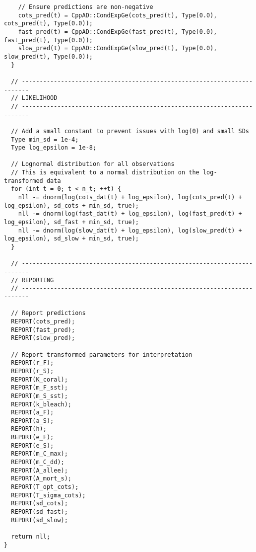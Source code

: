 \begin{lstlisting}
    // Ensure predictions are non-negative
    cots_pred(t) = CppAD::CondExpGe(cots_pred(t), Type(0.0), cots_pred(t), Type(0.0));
    fast_pred(t) = CppAD::CondExpGe(fast_pred(t), Type(0.0), fast_pred(t), Type(0.0));
    slow_pred(t) = CppAD::CondExpGe(slow_pred(t), Type(0.0), slow_pred(t), Type(0.0));
  }

  // ------------------------------------------------------------------------
  // LIKELIHOOD
  // ------------------------------------------------------------------------
  
  // Add a small constant to prevent issues with log(0) and small SDs
  Type min_sd = 1e-4;
  Type log_epsilon = 1e-8;

  // Lognormal distribution for all observations
  // This is equivalent to a normal distribution on the log-transformed data
  for (int t = 0; t < n_t; ++t) {
    nll -= dnorm(log(cots_dat(t) + log_epsilon), log(cots_pred(t) + log_epsilon), sd_cots + min_sd, true);
    nll -= dnorm(log(fast_dat(t) + log_epsilon), log(fast_pred(t) + log_epsilon), sd_fast + min_sd, true);
    nll -= dnorm(log(slow_dat(t) + log_epsilon), log(slow_pred(t) + log_epsilon), sd_slow + min_sd, true);
  }

  // ------------------------------------------------------------------------
  // REPORTING
  // ------------------------------------------------------------------------
  
  // Report predictions
  REPORT(cots_pred);
  REPORT(fast_pred);
  REPORT(slow_pred);

  // Report transformed parameters for interpretation
  REPORT(r_F);
  REPORT(r_S);
  REPORT(K_coral);
  REPORT(m_F_sst);
  REPORT(m_S_sst);
  REPORT(k_bleach);
  REPORT(a_F);
  REPORT(a_S);
  REPORT(h);
  REPORT(e_F);
  REPORT(e_S);
  REPORT(m_C_max);
  REPORT(m_C_dd);
  REPORT(A_allee);
  REPORT(A_mort_s);
  REPORT(T_opt_cots);
  REPORT(T_sigma_cots);
  REPORT(sd_cots);
  REPORT(sd_fast);
  REPORT(sd_slow);

  return nll;
}
\end{lstlisting}

